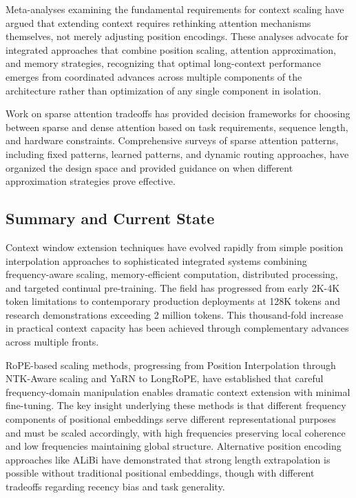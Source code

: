 \documentclass[11pt,letterpaper]{article}
\begin{document}
Meta-analyses examining the fundamental requirements for context scaling have argued that extending context requires rethinking attention mechanisms themselves, not merely adjusting position encodings. These analyses advocate for integrated approaches that combine position scaling, attention approximation, and memory strategies, recognizing that optimal long-context performance emerges from coordinated advances across multiple components of the architecture rather than optimization of any single component in isolation.

Work on sparse attention tradeoffs has provided decision frameworks for choosing between sparse and dense attention based on task requirements, sequence length, and hardware constraints. Comprehensive surveys of sparse attention patterns, including fixed patterns, learned patterns, and dynamic routing approaches, have organized the design space and provided guidance on when different approximation strategies prove effective.

\subsection{Summary and Current State}

Context window extension techniques have evolved rapidly from simple position interpolation approaches to sophisticated integrated systems combining frequency-aware scaling, memory-efficient computation, distributed processing, and targeted continual pre-training. The field has progressed from early 2K-4K token limitations to contemporary production deployments at 128K tokens and research demonstrations exceeding 2 million tokens. This thousand-fold increase in practical context capacity has been achieved through complementary advances across multiple fronts.

RoPE-based scaling methods, progressing from Position Interpolation through NTK-Aware scaling and YaRN to LongRoPE, have established that careful frequency-domain manipulation enables dramatic context extension with minimal fine-tuning. The key insight underlying these methods is that different frequency components of positional embeddings serve different representational purposes and must be scaled accordingly, with high frequencies preserving local coherence and low frequencies maintaining global structure. Alternative position encoding approaches like ALiBi have demonstrated that strong length extrapolation is possible without traditional positional embeddings, though with different tradeoffs regarding recency bias and task generality.
\end{document}
